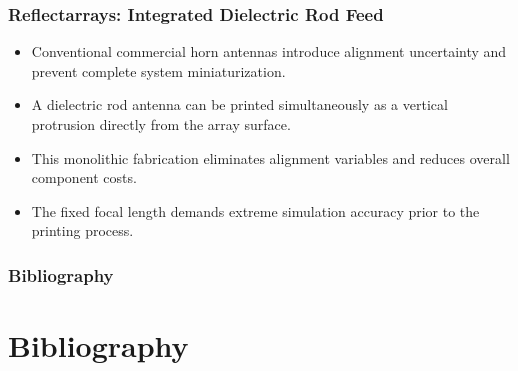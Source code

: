 \documentclass[aspectratio=43]{beamer}
\begin{document}
\begin{frame}[fragile]
  \frametitle{Reflectarrays: Integrated Dielectric Rod Feed}
  \begin{itemize}
    \item Conventional commercial horn antennas introduce alignment uncertainty and prevent complete system miniaturization.
    \item A dielectric rod antenna can be printed simultaneously as a vertical protrusion directly from the array surface.
    \item This monolithic fabrication eliminates alignment variables and reduces overall component costs.
    \item The fixed focal length demands extreme simulation accuracy prior to the printing process.
  \end{itemize}
\end{frame}

\appendix
\begin{frame}[plain]
  \frametitle{Bibliography}
  \section{Bibliography}
  \changefontsizes{7pt}
  \printbibliography
\end{frame}
\end{document}
